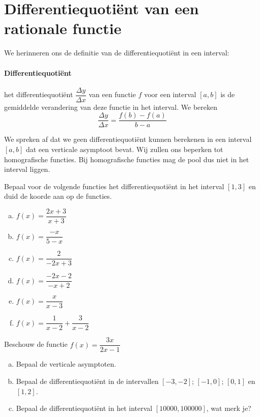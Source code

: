 \documentclass[12pt]{article}
\begin{document}
\pagebreak
\section{Differentiequotiënt van een rationale functie}

We herinneren ons de definitie van de differentiequotiënt in een interval:
\paragraph{Differentiequotiënt}
\begin{mdframed}
het differentiequotiënt $\dfrac{\Delta y}{\Delta x}$ van een functie $f$ voor een interval $[a, b]$ is de gemiddelde verandering van deze functie in het interval. We bereken
$$\dfrac{\Delta y}{\Delta x}=\dfrac{f(b)-f(a)}{b-a}$$
\end{mdframed}

We spreken af dat we geen differentiequotiënt kunnen berekenen in een interval $[a,b]$ dat een verticale asymptoot bevat. Wij zullen ons beperken tot homografische functies. Bij homografische functies mag de pool dus niet in het interval liggen.

\begin{oefening}
Bepaal voor de volgende functies het differentiequotiënt in het interval $[1,3]$ en duid de koorde aan op de functies.\\
\begin{enumerate}[(a)]
  \itemsep1em
  \item $f(x)=\dfrac{2x+3}{x+3}$
  \item $f(x)=\dfrac{-x}{5-x}$
  \item $f(x)=\dfrac{2}{-2x+3}$
  \item $f(x)=\dfrac{-2x-2}{-x+2}$
  \item $f(x)=\dfrac{x}{x-3}$
  \item $f(x)=\dfrac{1}{x-2}+\dfrac{3}{x-2}$
\end{enumerate}
\end{oefening}

\begin{oefening}
Beschouw de functie $f(x)=\dfrac{3x}{2x-1}$
\begin{enumerate}[(a)]
  \item Bepaal de verticale asymptoten.
  \item Bepaal de differentiequotiënt in de intervallen $[-3,-2]$; $[-1,0]$; $[0,1]$ en $[1,2]$.
  \item Bepaal de differentiequotiënt in het interval $[10000, 100000]$, wat merk je?
\end{enumerate}
\end{oefening}
\end{document}
